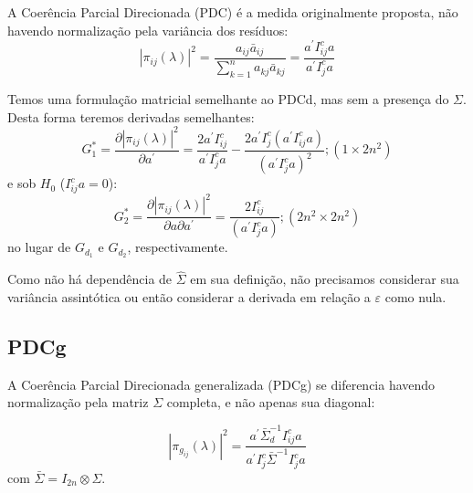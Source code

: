 \documentclass[a4paper,10pt]{article}
\begin{document}
A Coerência Parcial Direcionada (PDC) é a medida originalmente proposta, não havendo normalização pela variância dos resíduos:
\begin{equation}
|\pi_{ij}(\lambda)|^{2} = \frac{a_{ij} \bar{a}_{ij}}{\sum_{k=1}^{n}{a_{kj} \bar{a}_{kj}}} = \frac{a^{'} I_{ij}^{c} a}{a^{'} I_{j}^{c} a}
\end{equation}

Temos uma formulação matricial semelhante ao PDCd, mas sem a presença do $\Sigma$. Desta forma teremos derivadas semelhantes:
\begin{equation}
G_{1}^{\ast} = \frac{\partial |\pi_{ij}(\lambda)|^{2}}{\partial a^{'}} = \frac{2 a^{'} I_{ij}^{c}} {a^{'} I_{j}^{c} a} - \frac{2 a^{'} I_{j}^{c} (a^{'} I_{ij}^{c} a)} {(a^{'} I_{j}^{c} a)^{2}}; (1 \times 2n^{2})
\end{equation}
e sob $H_0$ ($I_{ij}^{c} a = 0$):
\begin{equation}
G_{2}^{\ast} = \frac{\partial |\pi_{ij}(\lambda)|^{2}}{\partial a \partial a^{'}} = \frac{2 I_{ij}^{c}}{(a^{'} I_{j}^{c} a)}; (2n^{2} \times 2n^{2})
\end{equation}
no lugar de $G_{d_1}$ e $G_{d_2}$, respectivamente.

Como não há dependência de $\hat{\Sigma}$ em sua definição, não precisamos considerar sua variância assintótica ou então considerar a derivada em relação a $\varepsilon$ como nula.

\subsection{PDCg}

A Coerência Parcial Direcionada generalizada (PDCg) se diferencia havendo normalização pela matriz $\Sigma$ completa, e não apenas sua diagonal:

\begin{equation}
 |\pi_{g_{ij}}(\lambda)|^{2}  = \frac{a^{'} \bar{\Sigma}_{d}^{-1} I_{ij}^{c} a}{a^{'} I_{j}^{c} \bar{\Sigma}^{-1} I_{j}^{c} a}
\end{equation}
com $\bar{\Sigma} = I_{2n} \otimes \Sigma$.
\end{document}
